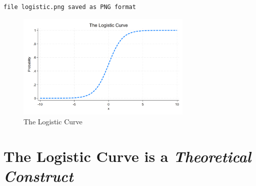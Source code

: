 \documentclass[
  letterpaper,
  DIV=11,
  numbers=noendperiod]{scrartcl}
\begin{document}
\begin{verbatim}
file logistic.png saved as PNG format
\end{verbatim}

\begin{figure}

{\centering \includegraphics[width=0.75\textwidth,height=\textheight]{logistic.png}

}

\caption{The Logistic Curve}

\end{figure}

\hypertarget{the-logistic-curve-is-a-theoretical-construct}{%
\section{\texorpdfstring{The Logistic Curve is a \emph{Theoretical
Construct}}{The Logistic Curve is a Theoretical Construct}}\label{the-logistic-curve-is-a-theoretical-construct}}
\end{document}
